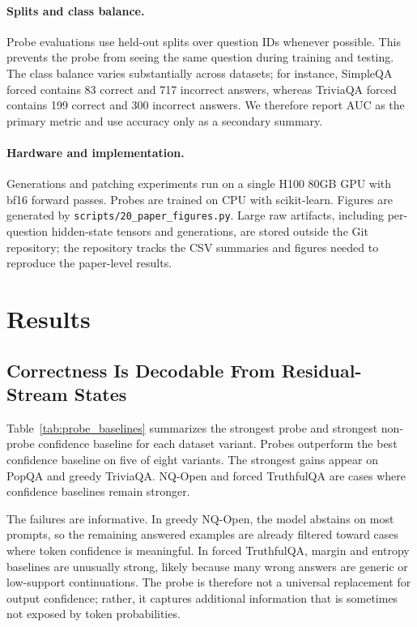 \documentclass[11pt]{article}
\begin{document}
\paragraph{Splits and class balance.}
Probe evaluations use held-out splits over question IDs whenever possible. This
prevents the probe from seeing the same question during training and testing. The
class balance varies substantially across datasets; for instance, SimpleQA forced
contains 83 correct and 717 incorrect answers, whereas TriviaQA forced contains
199 correct and 300 incorrect answers. We therefore report AUC as the primary
metric and use accuracy only as a secondary summary.

\paragraph{Hardware and implementation.}
Generations and patching experiments run on a single H100 80GB GPU with bf16
forward passes. Probes are trained on CPU with scikit-learn. Figures are generated
by \texttt{scripts/20\_paper\_figures.py}. Large raw artifacts, including
per-question hidden-state tensors and generations, are stored outside the Git
repository; the repository tracks the CSV summaries and figures needed to
reproduce the paper-level results.

\section{Results}

\subsection{Correctness Is Decodable From Residual-Stream States}

Table~\ref{tab:probe_baselines} summarizes the strongest probe and strongest
non-probe confidence baseline for each dataset variant. Probes outperform the best
confidence baseline on five of eight variants. The strongest gains appear on PopQA
and greedy TriviaQA. NQ-Open and forced TruthfulQA are cases where confidence
baselines remain stronger.

The failures are informative. In greedy NQ-Open, the model abstains on most
prompts, so the remaining answered examples are already filtered toward cases
where token confidence is meaningful. In forced TruthfulQA, margin and entropy
baselines are unusually strong, likely because many wrong answers are generic or
low-support continuations. The probe is therefore not a universal replacement for
output confidence; rather, it captures additional information that is sometimes
not exposed by token probabilities.
\end{document}
